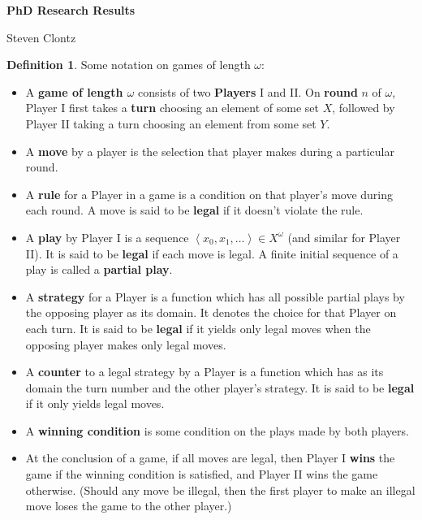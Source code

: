 \documentclass[11pt]{article}
\theoremstyle{plain}
\theoremstyle{definition}
\newtheorem{definition}[theorem]{Definition}
\theoremstyle{remark}
\begin{document}
\centerline{\bf PhD Research Results}
\centerline{Steven Clontz}

\begin{definition} Some notation on games of length $\omega$:

\begin{itemize}
\item A \textbf{game of length $\omega$} consists of two \textbf{Players} I and II. On \textbf{round} $n$ of $\omega$, Player I first takes a \textbf{turn} choosing an element of some set $X$, followed by Player II taking a turn choosing an element from some set $Y$.

\item A \textbf{move} by a player is the selection that player makes during a particular round. 

\item A \textbf{rule} for a Player in a game is a condition on that player's move during each round. A move is said to be \textbf{legal} if it doesn't violate the rule.

\item A \textbf{play} by Player I is a sequence $\left<x_0,x_1,\dots\right> \in X^\omega$ (and similar for Player II). It is said to be \textbf{legal} if each move is legal. A finite initial sequence of a play is called a \textbf{partial play}.

\item A \textbf{strategy} for a Player is a function which has all possible partial plays by the opposing player as its domain. It denotes the choice for that Player on each turn. It is said to be \textbf{legal} if it yields only legal moves when the opposing player makes only legal moves.

\item A \textbf{counter} to a legal strategy by a Player is a function which has as its domain the turn number and the other player's strategy. It is said to be \textbf{legal} if it only yields legal moves.

\item A \textbf{winning condition} is some condition on the plays made by both players.

\item At the conclusion of a game, if all moves are legal, then Player I \textbf{wins} the game if the winning condition is satisfied, and Player II wins the game otherwise. (Should any move be illegal, then the first player to make an illegal move loses the game to the other player.)
\end{itemize}
\end{definition}
\end{document}
